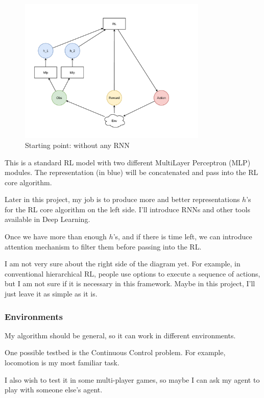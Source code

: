 \begin{figure}[h]
    \centering
    \includegraphics[width=0.8\textwidth]{images/step-0.pdf}
    \caption{Starting point: without any RNN}
    \label{fig:starting_point}
\end{figure}

This is a standard RL model with two different MultiLayer Perceptron (MLP) modules.
The representation (in blue) will be concatenated and pass into the RL core algorithm.

Later in this project, my job is to produce more and better representations $h$'s for the RL core algorithm on the left side.
I'll introduce RNNs and other tools available in Deep Learning.

Once we have more than enough $h$'s, and if there is time left,  we can introduce attention mechanism to filter them before passing into the RL.

I am not very sure about the right side of the diagram yet.
For example, in conventional hierarchical RL, people use options to execute a sequence of actions, but I am not sure if it is necessary in this framework.
Maybe in this project, I'll just leave it as simple as it is.

\subsubsection{Environments}
My algorithm should be general, so it can work in different environments.

One possible testbed is the Continuous Control problem.
For example, locomotion is my most familiar task.

I also wish to test it in some multi-player games, so maybe I can ask my agent to play with someone else's agent.

